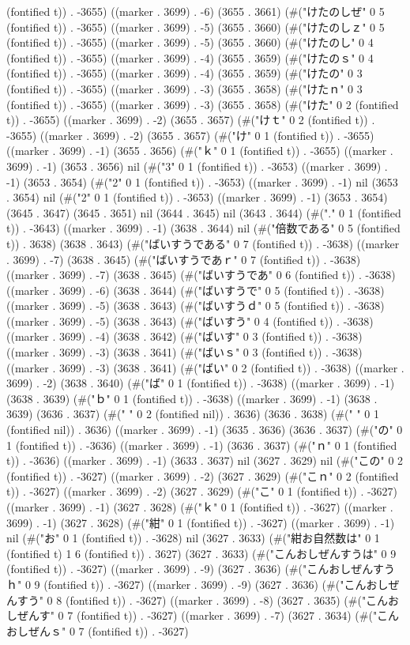 (fontified t)) . -3655) ((marker . 3699) . -6) (3655 . 3661) (#("けたのしぜ" 0 5 (fontified t)) . -3655) ((marker . 3699) . -5) (3655 . 3660) (#("けたのしｚ" 0 5 (fontified t)) . -3655) ((marker . 3699) . -5) (3655 . 3660) (#("けたのし" 0 4 (fontified t)) . -3655) ((marker . 3699) . -4) (3655 . 3659) (#("けたのｓ" 0 4 (fontified t)) . -3655) ((marker . 3699) . -4) (3655 . 3659) (#("けたの" 0 3 (fontified t)) . -3655) ((marker . 3699) . -3) (3655 . 3658) (#("けたｎ" 0 3 (fontified t)) . -3655) ((marker . 3699) . -3) (3655 . 3658) (#("けた" 0 2 (fontified t)) . -3655) ((marker . 3699) . -2) (3655 . 3657) (#("けｔ" 0 2 (fontified t)) . -3655) ((marker . 3699) . -2) (3655 . 3657) (#("け" 0 1 (fontified t)) . -3655) ((marker . 3699) . -1) (3655 . 3656) (#("ｋ" 0 1 (fontified t)) . -3655) ((marker . 3699) . -1) (3653 . 3656) nil (#("3" 0 1 (fontified t)) . -3653) ((marker . 3699) . -1) (3653 . 3654) (#("2" 0 1 (fontified t)) . -3653) ((marker . 3699) . -1) nil (3653 . 3654) nil (#("2" 0 1 (fontified t)) . -3653) ((marker . 3699) . -1) (3653 . 3654) (3645 . 3647) (3645 . 3651) nil (3644 . 3645) nil (3643 . 3644) (#("." 0 1 (fontified t)) . -3643) ((marker . 3699) . -1) (3638 . 3644) nil (#("倍数である" 0 5 (fontified t)) . 3638) (3638 . 3643) (#("ばいすうである" 0 7 (fontified t)) . -3638) ((marker . 3699) . -7) (3638 . 3645) (#("ばいすうであｒ" 0 7 (fontified t)) . -3638) ((marker . 3699) . -7) (3638 . 3645) (#("ばいすうであ" 0 6 (fontified t)) . -3638) ((marker . 3699) . -6) (3638 . 3644) (#("ばいすうで" 0 5 (fontified t)) . -3638) ((marker . 3699) . -5) (3638 . 3643) (#("ばいすうｄ" 0 5 (fontified t)) . -3638) ((marker . 3699) . -5) (3638 . 3643) (#("ばいすう" 0 4 (fontified t)) . -3638) ((marker . 3699) . -4) (3638 . 3642) (#("ばいす" 0 3 (fontified t)) . -3638) ((marker . 3699) . -3) (3638 . 3641) (#("ばいｓ" 0 3 (fontified t)) . -3638) ((marker . 3699) . -3) (3638 . 3641) (#("ばい" 0 2 (fontified t)) . -3638) ((marker . 3699) . -2) (3638 . 3640) (#("ば" 0 1 (fontified t)) . -3638) ((marker . 3699) . -1) (3638 . 3639) (#("ｂ" 0 1 (fontified t)) . -3638) ((marker . 3699) . -1) (3638 . 3639) (3636 . 3637) (#("  " 0 2 (fontified nil)) . 3636) (3636 . 3638) (#(" " 0 1 (fontified nil)) . 3636) ((marker . 3699) . -1) (3635 . 3636) (3636 . 3637) (#("の" 0 1 (fontified t)) . -3636) ((marker . 3699) . -1) (3636 . 3637) (#("ｎ" 0 1 (fontified t)) . -3636) ((marker . 3699) . -1) (3633 . 3637) nil (3627 . 3629) nil (#("この" 0 2 (fontified t)) . -3627) ((marker . 3699) . -2) (3627 . 3629) (#("こｎ" 0 2 (fontified t)) . -3627) ((marker . 3699) . -2) (3627 . 3629) (#("こ" 0 1 (fontified t)) . -3627) ((marker . 3699) . -1) (3627 . 3628) (#("ｋ" 0 1 (fontified t)) . -3627) ((marker . 3699) . -1) (3627 . 3628) (#("紺" 0 1 (fontified t)) . -3627) ((marker . 3699) . -1) nil (#("お" 0 1 (fontified t)) . -3628) nil (3627 . 3633) (#("紺お自然数は" 0 1 (fontified t) 1 6 (fontified t)) . 3627) (3627 . 3633) (#("こんおしぜんすうは" 0 9 (fontified t)) . -3627) ((marker . 3699) . -9) (3627 . 3636) (#("こんおしぜんすうｈ" 0 9 (fontified t)) . -3627) ((marker . 3699) . -9) (3627 . 3636) (#("こんおしぜんすう" 0 8 (fontified t)) . -3627) ((marker . 3699) . -8) (3627 . 3635) (#("こんおしぜんす" 0 7 (fontified t)) . -3627) ((marker . 3699) . -7) (3627 . 3634) (#("こんおしぜんｓ" 0 7 (fontified t)) . -3627) 